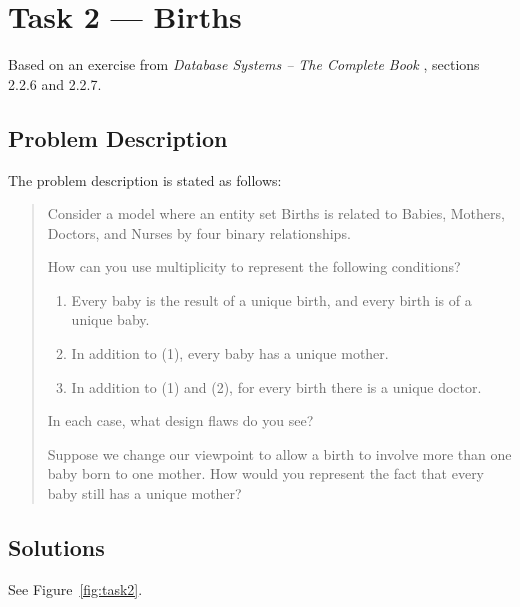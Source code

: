 %
%
%


\section{Task 2 --- Births}
Based on an exercise from \emph{Database Systems -- The Complete Book}
\cite{2dv513:dbs}, sections 2.2.6 and 2.2.7.

\subsection{Problem Description}
The problem description \cite{2dv513:assignment1-instructions} is stated as
follows:

\begin{quote}
  Consider a model where an entity set Births is related to Babies, Mothers,
  Doctors, and Nurses by four binary relationships.

  How can you use multiplicity to represent the following conditions?

  \begin{enumerate}
    \item
      Every baby is the result of a unique birth, and every birth is of a
      unique baby.
    \item
      In addition to (1), every baby has a unique mother.
    \item
      In addition to (1) and (2), for every birth there is a unique doctor.
  \end{enumerate}

  In each case, what design flaws do you see?

  Suppose we change our viewpoint to allow a birth to involve more than one
  baby born to one mother.
  How would you represent the fact that every baby still has a unique mother?
\end{quote}


\subsection{Solutions}
See Figure~\ref{fig:task2}.


